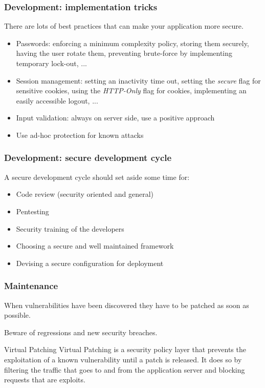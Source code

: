 \begin{frame}
\frametitle{Development: implementation tricks}

There are lots of best practices that can make your application more
secure.

\begin{itemize}
\item Passwords: enforcing a minimum complexity policy, storing them securely,
having the user rotate them, preventing brute-force by implementing temporary
lock-out, ...
\item Session management: setting an inactivity time out, setting the
\emph{secure} flag for sensitive cookies, using the \emph{HTTP-Only} flag for
cookies, implementing an easily accessible logout, ...
\item Input validation: always on server side, use a positive
  approach
\item Use ad-hoc protection for known attacks
\end{itemize}
\end{frame}

\begin{frame}
\frametitle{Development: secure development cycle}
A secure development cycle should set aside some time for:
\begin{itemize}
\item Code review \small{(security oriented and general)}
\item Pentesting
\item Security training of the developers
\item Choosing a secure and well maintained framework
\item Devising a secure configuration for deployment
\end{itemize}

\end{frame}

\begin{frame}
\frametitle{Maintenance}
When vulnerabilities have been discovered they have to be patched as soon as
possible.

Beware of regressions and new security breaches.

\begin{block}{Virtual Patching}
Virtual Patching is a security policy layer that prevents the exploitation of a known
vulnerability until a patch is released. It does so by filtering the
traffic that goes to and from the application server and blocking
requests that are exploits.
\end{block}

\end{frame}

